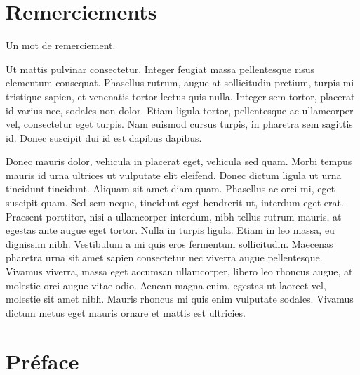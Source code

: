 \documentclass{FramateX}
\begin{document}
                        
                        
                       
                        
\cleardoublepage

\chapter*{Remerciements}
{}

%

Un mot de remerciement.

Ut mattis pulvinar consectetur. Integer feugiat massa pellentesque risus elementum consequat. Phasellus rutrum, augue at sollicitudin pretium, turpis mi tristique sapien, et venenatis tortor lectus quis nulla. Integer sem tortor, placerat id varius nec, sodales non dolor. Etiam ligula tortor, pellentesque ac ullamcorper vel, consectetur eget turpis. Nam euismod cursus turpis, in pharetra sem sagittis id. Donec suscipit dui id est dapibus dapibus.

Donec mauris dolor, vehicula in placerat eget, vehicula sed quam. Morbi tempus mauris id urna ultrices ut vulputate elit eleifend. Donec dictum ligula ut urna tincidunt tincidunt. Aliquam sit amet diam quam. Phasellus ac orci mi, eget suscipit quam. Sed sem neque, tincidunt eget hendrerit ut, interdum eget erat. Praesent porttitor, nisi a ullamcorper interdum, nibh tellus rutrum mauris, at egestas ante augue eget tortor. Nulla in turpis ligula. Etiam in leo massa, eu dignissim nibh. Vestibulum a mi quis eros fermentum sollicitudin. Maecenas pharetra urna sit amet sapien consectetur nec viverra augue pellentesque. Vivamus viverra, massa eget accumsan ullamcorper, libero leo rhoncus augue, at molestie orci augue vitae odio. Aenean magna enim, egestas ut laoreet vel, molestie sit amet nibh. Mauris rhoncus mi quis enim vulputate sodales. Vivamus dictum metus eget mauris ornare et mattis est ultricies.

                        
                        
%
\cleardoublepage

\chapter*{Préface}
{}
%
\end{document}
